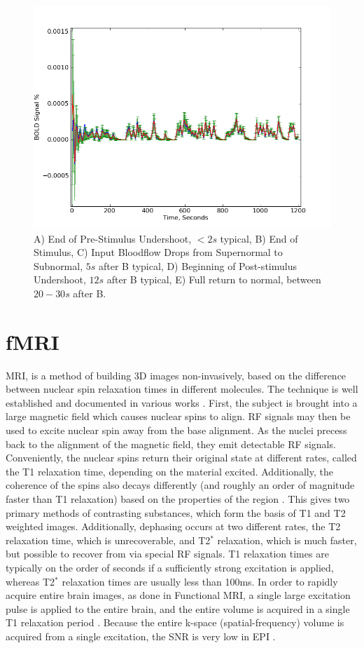 \begin{figure}
\centering
\includegraphics[width=.5\textwidth]{images/bold}
\caption[Diagram of \ac{BOLD} Signal]{A) End of Pre-Stimulus Undershoot, $< 2s$ typical,
B) End of Stimulus, C) Input Bloodflow Drops from Supernormal to Subnormal,
$5 s$ after B typical, D) Beginning of Post-stimulus Undershoot, $12 s$ after B
typical, E) Full return to normal, between $20-30s$ after B. \cite{Behzadi2005}}
\end{figure}

\section{\ac{fMRI}}
\ac{MRI}, is a method of building 3D images
non-invasively, based on the difference between nuclear spin
relaxation times in different molecules. The technique is
well established and documented in various works \cite{Bushberg2002}. 
First, the subject 
is brought into a large magnetic field which causes nuclear spins
to align. \ac{RF} signals may
then be used to excite nuclear spin away from the base alignment. 
As the nuclei precess back to the alignment of the magnetic
field, they emit detectable \ac{RF} signals. Conveniently, the
nuclear spins return their original state at different
rates, called the \ac{T1} relaxation time, depending on the material excited.
Additionally, the
coherence of the spins also decays differently (and roughly an order of 
magnitude faster
than \ac{T1} relaxation) based on the properties of the region 
\cite{Bushberg2002}.
This gives two primary methods of contrasting substances,
which form the basis of \ac{T1} and \ac{T2} weighted images. Additionally, 
dephasing occurs at two different rates, the \ac{T2} relaxation time,
which is unrecoverable, and \ac{T2}$^*$ relaxation, which is
much faster, but possible to recover from via special \ac{RF} signals.
\ac{T1} relaxation times are typically on the order of seconds if 
a sufficiently strong excitation is applied, whereas \ac{T2}$^*$ relaxation
times are usually less than 100ms. 
In order to rapidly acquire entire brain images, as done in Functional 
\ac{MRI}, a single large excitation pulse is applied to the entire brain,
and the entire volume is acquired in a single \ac{T1} relaxation period
\cite{Obata2004}. 
Because the entire k-space (spatial-frequency) volume is acquired 
from a single excitation, the \ac{SNR} is very low
in \ac{EPI} \cite{Smith2007}. 

